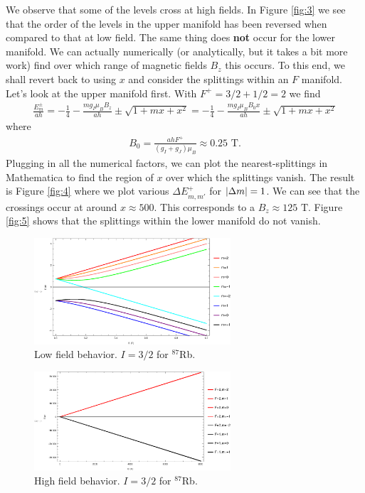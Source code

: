\documentclass{article}
\theoremstyle{definition}
\newcommand{\f}[2]{\frac{#1}{#2}}
\begin{document}
\begin{enumerate}[label=(\alph*)]
	
	We observe that some of the levels cross at high fields. In Figure \ref{fig:3} we see that the order of the levels in the upper manifold has been reversed when compared to that at low field. The same thing does \textbf{not} occur for the lower manifold. We can actually numerically (or analytically, but it takes a bit more work) find over which range of magnetic fields $B_z$ this occurs. To this end, we shall revert back to using $x$ and consider the splittings within an $F$ manifold. Let's look at the upper manifold first. With $F^+=3/2+1/2=2$ we find
	\begin{align*}
	\f{E^\pm_m}{ah} = -\f{1}{4}-\f{mg_I \mu_B B_z}{ah} \pm \sqrt{1+mx+x^2} =-\f{1}{4}-\f{mg_I \mu_B B_0 x}{ah} \pm \sqrt{1+mx+x^2} 
	\end{align*}
	where
	\begin{align*}
	B_0 = \f{ah F^+}{(g_I + g_J) \mu_B } \approx 0.25 \text{ T}.
	\end{align*}
	Plugging in all the numerical factors, we can plot the nearest-splittings in Mathematica to find the region of $x$ over which the splittings vanish. The result is Figure \ref{fig:4} where we plot various $\Delta E^+_{m,m'}$ for $\abs{\Delta m} = 1$. We can see that the crossings occur at around $x\approx 500$. This corresponds to a $B_z \approx 125 \text{ T}$. Figure \ref{fig:5} shows that the splittings within the lower manifold do not vanish.
	
	
	\begin{figure}[!htb]
		\centering
		\includegraphics[width=0.65\textwidth]{low-field.eps}
		\caption{Low field behavior. $I=3/2$ for $^{87}$Rb.}
		\label{fig:1}
	\end{figure}


	\begin{figure}[!htb]
		\centering
		\includegraphics[width=0.65\textwidth]{high-field.eps}
		\caption{High field behavior. $I=3/2$ for $^{87}$Rb.}
		\label{fig:2}
	\end{figure}






\end{enumerate}
\end{document}
